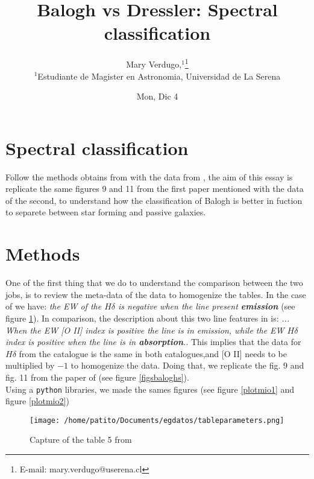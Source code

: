 \documentclass[fleqn,usenatbib]{mnras}
\title[Extragalactic Astronomy]{Balogh vs Dressler: Spectral classification}
\author[Mary Verdugo]{
Mary Verdugo,$^{1}$\thanks{E-mail: mary.verdugo@userena.cl}
\\
$^{1}$Estudiante de Magister en Astronomia, Universidad de La Serena\\
}
\date{Mon, Dic 4}
\begin{document}
\label{firstpage}
\pagerange{\pageref{firstpage}--\pageref{lastpage}}
\maketitle







\section{Spectral classification}

Follow the methods obtains from \citet[]{Balogh} with the data from
\citet[]{Dressler}, the aim of this essay is replicate the same figures
9 and 11 from the first paper mentioned with the data of the second, to understand how the classification of Balogh is better in fuction to separete between star forming and passive galaxies.
\\

\section{Methods}
One of the first thing that we do to understand the comparison between the two jobs, is to review the meta-data of the data to homogenize the tables. In the case of \citet{Dressler} we have: \textit{the EW of the $H\delta$  is negative when the line present \textbf{emission}} (see figure \ref{dresslertable}). In comparison, the description about this two line features in \citet{Balogh} is: \textit{... When the EW [O II] index is positive the line is in emission, while the EW $H\delta$ index is positive when the line is in \textbf{absorption}.}. This implies that the data for $H\delta$ from the \citet{Dressler} catalogue is the same in both catalogues,and [O II] needs to be multiplied by $-1$ to homogenize the data. Doing that, we replicate the fig. 9 and fig. 11 from the paper of \citet{Balogh} (see figure \ref{figsbaloghs}).
\\

Using a \texttt{python} libraries, we made the sames figures (see figure \ref{plotmio1} and figure \ref{plotmio2}) 

\begin{figure}
	\texttt{[image: /home/patito/Documents/egdatos/tableparameters.png]}
    \caption{Capture of the table 5 from \citet{Dressler}}
    \label{dresslertable}
\end{figure}
\end{document}

